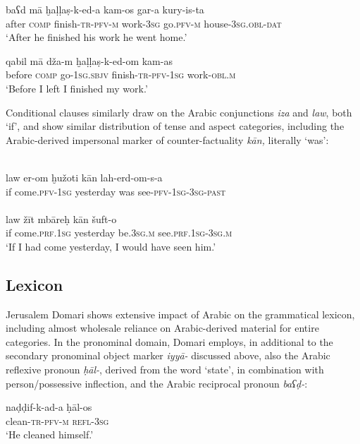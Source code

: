 \documentclass[output=paper]{langsci/langscibook}
\begin{document}
\ea\label{after} \gll baʕd mā ḫaḷḷaṣ-k-ed-a kam-os gar-a kury-is-ta\\
     after \textsc{comp} finish-\textsc{tr-pfv-m} work-\textsc{3sg} go.\textsc{pfv-m} house-\textsc{3sg.obl-dat}\\
\glt     ‘After he finished his work he went home.’
\z

\ea\label{before} \gll qabil mā dža-m ḫaḷḷaṣ-k-ed-om kam-as\\
       before  \textsc{comp} go-\textsc{1sg.sbjv} finish-\textsc{tr-pfv-1sg} work-\textsc{obl.m}\\
\glt     ‘Before I left I finished my work.’
\z

Conditional clauses similarly draw on the Arabic conjunctions \textit{iza} and \textit{law}, both ‘if’, and show similar distribution of tense and aspect categories, including the Arabic-derived impersonal marker of counter-factuality \textit{kān,} literally ‘was’:

\ea\label{ex:matras:}
\ea
{}\\
\gll law er-om ḫužoti kān lah-erd-om-s-a \\
       if come.\textsc{pfv-1sg} yesterday was see-\textsc{pfv-1sg-3sg-past}\\
\ex
{}\\
\gll law žīt mbāreḥ kān šuft-o  \\
       if come.\textsc{prf.1sg} yesterday be.\textsc{3sg.m} see.\textsc{prf.1sg-3sg.m}\\
\glt   ‘If I had come yesterday, I would have seen him.’
\z
\z

\subsection{Lexicon
}

Jerusalem Domari shows extensive impact of Arabic on the grammatical lexicon, including almost wholesale reliance on Arabic-derived material for entire categories. In the pronominal domain, Domari employs, in additional to the secondary pronominal object marker \textit{iyyā-} discussed above, also the Arabic reflexive pronoun \textit{ḥāl-}, derived from the word ‘state’, in combination with person/possessive inflection, and the Arabic reciprocal pronoun \textit{baʕḍ-}:

\ea \gll naḍḍif-k-ad-a ḥāl-os\\
     clean-\textsc{tr-pfv-m} \textsc{refl-3sg}\\
\glt ‘He cleaned himself.’
\z
\end{document}
